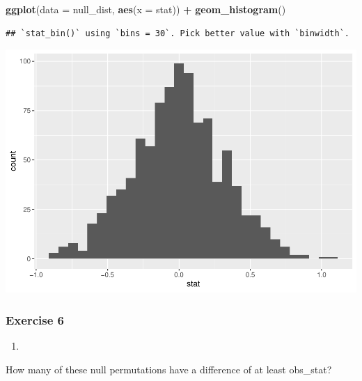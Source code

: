 \documentclass[
]{article}
\newenvironment{Shaded}{\begin{snugshade}}{\end{snugshade}}
\newcommand{\ControlFlowTok}[1]{\textcolor[rgb]{0.13,0.29,0.53}{\textbf{#1}}}
\newcommand{\DataTypeTok}[1]{\textcolor[rgb]{0.13,0.29,0.53}{#1}}
\newcommand{\DecValTok}[1]{\textcolor[rgb]{0.00,0.00,0.81}{#1}}
\newcommand{\KeywordTok}[1]{\textcolor[rgb]{0.13,0.29,0.53}{\textbf{#1}}}
\newcommand{\NormalTok}[1]{#1}
\newcommand{\OperatorTok}[1]{\textcolor[rgb]{0.81,0.36,0.00}{\textbf{#1}}}
\newcommand{\OtherTok}[1]{\textcolor[rgb]{0.56,0.35,0.01}{#1}}
\newcommand{\StringTok}[1]{\textcolor[rgb]{0.31,0.60,0.02}{#1}}
\begin{document}
\begin{Shaded}
\begin{Highlighting}[]
\KeywordTok{ggplot}\NormalTok{(}\DataTypeTok{data =}\NormalTok{ null_dist, }\KeywordTok{aes}\NormalTok{(}\DataTypeTok{x =}\NormalTok{ stat)) }\OperatorTok{+}
\StringTok{  }\KeywordTok{geom_histogram}\NormalTok{()}
\end{Highlighting}
\end{Shaded}

\begin{verbatim}
## `stat_bin()` using `bins = 30`. Pick better value with `binwidth`.
\end{verbatim}

\includegraphics{lab-7_files/figure-latex/unnamed-chunk-9-1.pdf}

\hypertarget{exercise-6}{%
\subsubsection{Exercise 6}\label{exercise-6}}

\begin{enumerate}
\def\labelenumi{\arabic{enumi}.}
\item
\end{enumerate}

How many of these null permutations have a difference of at least
obs\_stat?

\begin{Shaded}
\end{Shaded}
\end{document}
